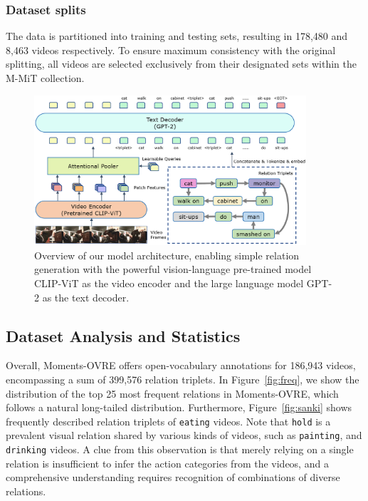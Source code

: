 \documentclass[letterpaper]{article}
\begin{document}
\subsubsection{Dataset splits}
The data is partitioned into training and testing sets, resulting in 178,480 and 8,463 videos respectively.
To ensure maximum consistency with the original splitting, all videos are selected exclusively from their designated sets within the M-MiT collection.
\begin{figure}[t]
  \centering
  \includegraphics[width=0.9\textwidth]{fig/model-.png}
  \caption{Overview of our model architecture, enabling simple relation generation with the powerful vision-language pre-trained model CLIP-ViT as the video encoder and the large language model GPT-2 as the text decoder.
  }
  \label{fig:arch}
\end{figure}

\subsection{Dataset Analysis and Statistics}
Overall, Moments-OVRE offers open-vocabulary annotations for 186,943 videos, encompassing a sum of 399,576 relation triplets. 
In Figure~\ref{fig:freq}, we show the distribution of the top 25 most frequent relations in Moments-OVRE, which follows a natural long-tailed distribution. Furthermore, Figure~\ref{fig:sanki} shows frequently described relation triplets of \texttt{eating} videos. Note that \texttt{hold} is a prevalent visual relation shared by various kinds of videos, such as \texttt{painting}, and \texttt{drinking} videos. A clue from this observation is that merely relying on a single relation is insufficient to infer the action categories from the videos, and a comprehensive understanding requires recognition of combinations of diverse relations. 
\end{document}
